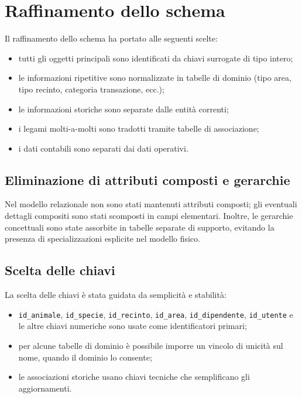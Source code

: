 \documentclass[12pt,a4paper]{report}
\begin{document}
\section{Raffinamento dello schema}

Il raffinamento dello schema ha portato alle seguenti scelte:

\begin{itemize}[itemsep=2pt]
    \item tutti gli oggetti principali sono identificati da chiavi surrogate di tipo intero;
    \item le informazioni ripetitive sono normalizzate in tabelle di dominio (tipo area, tipo recinto, categoria transazione, ecc.);
    \item le informazioni storiche sono separate dalle entità correnti;
    \item i legami molti-a-molti sono tradotti tramite tabelle di associazione;
    \item i dati contabili sono separati dai dati operativi.
\end{itemize}

\subsection{Eliminazione di attributi composti e gerarchie}

Nel modello relazionale non sono stati mantenuti attributi composti; gli eventuali
dettagli compositi sono stati scomposti in campi elementari. Inoltre, le gerarchie
concettuali sono state assorbite in tabelle separate di supporto, evitando la
presenza di specializzazioni esplicite nel modello fisico.

\subsection{Scelta delle chiavi}

La scelta delle chiavi è stata guidata da semplicità e stabilità:
\begin{itemize}[itemsep=2pt]
    \item \texttt{id\_animale}, \texttt{id\_specie}, \texttt{id\_recinto}, \texttt{id\_area}, \texttt{id\_dipendente}, \texttt{id\_utente} e le altre chiavi numeriche sono usate come identificatori primari;
    \item per alcune tabelle di dominio è possibile imporre un vincolo di unicità sul nome, quando il dominio lo consente;
    \item le associazioni storiche usano chiavi tecniche che semplificano gli aggiornamenti.
\end{itemize}
\end{document}
